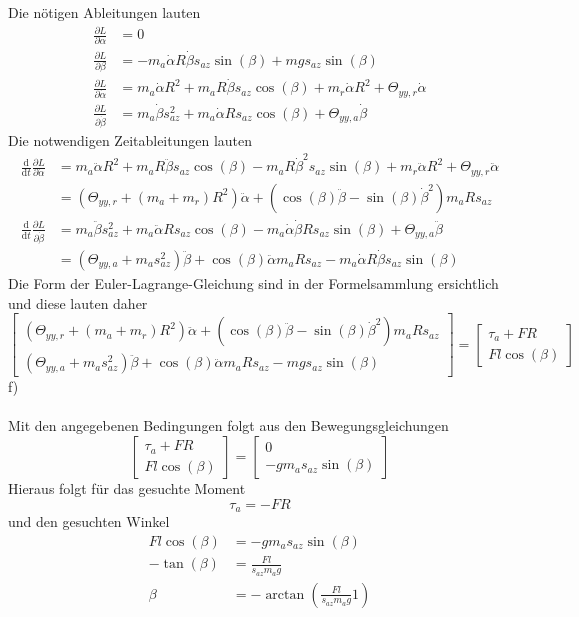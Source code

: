 \newpage
\noindent
Die nötigen Ableitungen lauten
\begin{align*}
	\frac{\partial L}{\partial \alpha} &= 0 \\
	\frac{\partial L}{\partial \beta} &= -m_a\dot{\alpha}R\dot{\beta}s_{az}\sin(\beta) + mgs_{az}\sin(\beta) \\
	\frac{\partial L}{\partial \dot{\alpha}} &= m_a \dot{\alpha}R^2 + m_aR\dot{\beta}s_{az}\cos(\beta) + m_r\dot{\alpha}R^2 + \Theta_{yy,r}\dot{\alpha} \\
	\frac{\partial L}{\partial \dot{\beta}} &= m_a\dot{\beta}s^2_{az} + m_a\dot{\alpha}Rs_{az}\cos(\beta) + \Theta_{yy,a}\dot{\beta}
\end{align*}
Die notwendigen Zeitableitungen lauten
\begin{align*}
	\frac{\text{d}}{\text{d}t}\frac{\partial L}{\partial \dot{\alpha}} &= m_a\ddot{\alpha}R^2 + m_aR\ddot{\beta}s_{az}\cos(\beta) - m_aR\dot{\beta}^2s_{az}\sin(\beta) + m_r\ddot{\alpha}R^2 + \Theta_{yy,r}\ddot{\alpha} \\
	&= (\Theta_{yy,r} + (m_a + m_r)R^2)\ddot{\alpha} + \left(\cos(\beta)\ddot{\beta} - \sin(\beta)\dot{\beta}^2\right)m_aRs_{az} \\
	\frac{\text{d}}{\text{d}t}\frac{\partial L}{\partial \dot{\beta}} &= m_a\ddot{\beta}s^2_{az} + m_a\ddot{\alpha}Rs_{az}\cos(\beta) - m_a\dot{\alpha}\dot{\beta}Rs_{az}\sin(\beta) + \Theta_{yy,a}\ddot{\beta} \\
	&= (\Theta_{yy,a} + m_as^2_{az})\ddot{\beta} + \cos(\beta)\ddot{\alpha}m_aRs_{az} - m_a\dot{\alpha}R\dot{\beta}s_{az}\sin(\beta)
\end{align*}
Die Form der Euler-Lagrange-Gleichung sind in der Formelsammlung ersichtlich und diese lauten daher
\[
	\begin{bmatrix}
		 (\Theta_{yy,r} + (m_a + m_r)R^2)\ddot{\alpha} + \left(\cos(\beta)\ddot{\beta} - \sin(\beta)\dot{\beta}^2\right)m_aRs_{az} \\
		 (\Theta_{yy,a} + m_as^2_{az})\ddot{\beta} + \cos(\beta)\ddot{\alpha}m_aRs_{az} - mgs_{az}\sin(\beta)
	\end{bmatrix}
	=
	\begin{bmatrix}
		\tau_a + FR \\
		Fl\cos(\beta)
	\end{bmatrix}
\]
f)\\ \\
Mit den angegebenen Bedingungen folgt aus den Bewegungsgleichungen
\[
	\begin{bmatrix}
	\tau_a + FR \\
	Fl\cos(\beta)
	\end{bmatrix}
	=
	\begin{bmatrix}
		0 \\
		- gm_as_{az}\sin(\beta)
	\end{bmatrix}
\]
Hieraus folgt für das gesuchte Moment
\[
	\tau_a = - FR
\]
und den gesuchten Winkel
\begin{align*}
	Fl\cos(\beta) &= - gm_as_{az}\sin(\beta) \\
	-\tan(\beta) &= \frac{Fl}{s_{az}m_ag} \\
	\beta &= - \arctan\left(\frac{Fl}{s_{az}m_ag}1\right)
\end{align*}